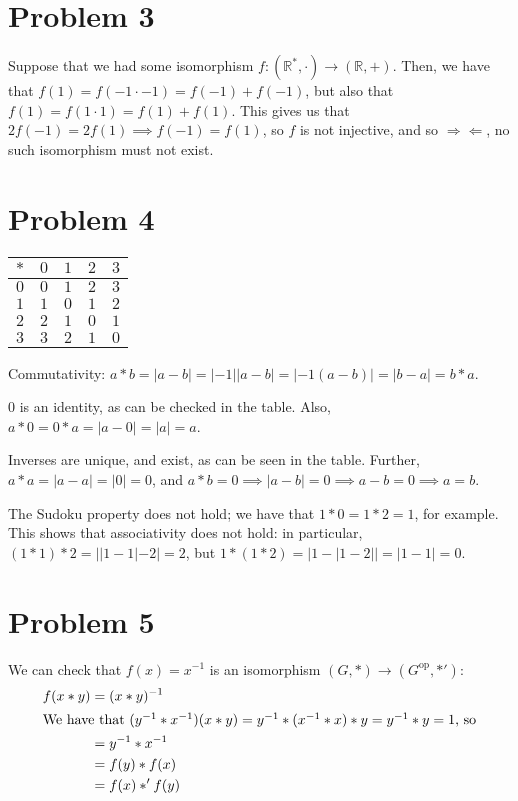 \documentclass[12pt,letterpaper]{article}
\theoremstyle{definition}
\newcommand{\contra}{\Rightarrow\!\Leftarrow}
\newcommand{\R}{\mathbb{R}}
\begin{document}
\section*{Problem 3}

Suppose that we had some isomorphism \(f: (\R^{*}, \cdot) \rightarrow (\R, +)\). Then, we have that \(f(1) = f(-1 \cdot -1) = f(-1) + f(-1)\), but also that \(f(1) = f(1 \cdot 1) = f(1) + f(1)\). This gives us that \(2f(-1) = 2f(1) \implies f(-1) = f(1)\), so \(f\) is not injective, and so \(\contra\), no such isomorphism must not exist.

\section*{Problem 4}

\begin{center}
  \begin{tabular}{c||c|c|c|c}
    \(*\) & \(0\) & \(1\) & \(2\) & \(3\) \\ \hline \hline
    \(0\) & \(0\) & \(1\) & \(2\) & \(3\) \\ \hline
    \(1\) & \(1\) & \(0\) & \(1\) & \(2\) \\ \hline
    \(2\) & \(2\) & \(1\) & \(0\) & \(1\) \\ \hline
    \(3\) & \(3\) & \(2\) & \(1\) & \(0\) \\
  \end{tabular}
\end{center}

Commutativity: \(a * b = |a - b| = |-1||a-b| = |-1(a-b)| = |b-a| = b * a\).

0 is an identity, as can be checked in the table. Also, \(a * 0 = 0 * a = |a - 0| = |a| = a\).

Inverses are unique, and exist, as can be seen in the table. Further, \(a * a = |a - a| = |0| = 0\), and \(a * b = 0 \implies |a-b| = 0 \implies a-b = 0 \implies a = b\).

The Sudoku property does not hold; we have that \(1 * 0 = 1 * 2 = 1\), for example. This shows that associativity does not hold: in particular, \((1 * 1) * 2 = ||1 - 1| - 2| = 2\), but \(1 * (1 * 2) = |1 - |1 - 2|| = |1 - 1| = 0\).

\section*{Problem 5}

We can check that \(f(x) = x^{-1}\) is an isomorphism \((G, *) \rightarrow (G^{\text{op}}, *')\):
\begin{align*}
  f(x * y) &= (x * y)^{-1} \\
  \intertext{We have that \((y^{-1} * x^{-1})(x * y) = y^{-1} * (x^{-1} * x) * y = y^{-1} * y = 1\), so}
           &= y^{-1} * x^{-1} \\
           &= f(y) * f(x) \\
           &= f(x) *' f(y)
\end{align*}
\end{document}
